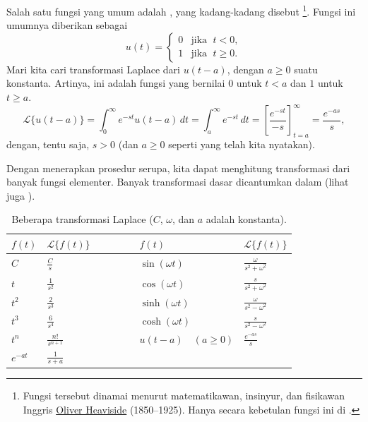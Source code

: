 \begin{example}
Salah satu fungsi yang umum adalah \emph{}, yang
kadang-kadang disebut \emph{}%
\footnote{Fungsi tersebut dinamai menurut matematikawan, insinyur, dan
fisikawan Inggris
\href{https://en.wikipedia.org/wiki/Heaviside}{Oliver Heaviside}
(1850--1925).  Hanya
secara kebetulan fungsi ini  di .}.
Fungsi ini umumnya diberikan sebagai
\begin{equation*}
u(t) = 
\begin{cases}
0 & \text{jika } \; t < 0 , \\
1 & \text{jika } \; t \geq 0 .
\end{cases}
\end{equation*}
Mari kita cari transformasi Laplace dari $u(t-a)$, dengan $a \geq 0$
suatu konstanta.
Artinya, ini adalah fungsi yang bernilai $0$ untuk $t < a$ dan $1$ untuk $t \geq a$.
\begin{equation*}
\mathcal{L} \bigl\{ u(t-a) \bigr\}
=
\int_0^{\infty} e^{-st} u(t-a) \, dt
=
\int_a^{\infty} e^{-st} \, dt
=
\left[ \frac{e^{-st}}{-s} \right]_{t=a}^\infty
=
\frac{e^{-as}}{s} ,
\end{equation*}
dengan, tentu saja, $s > 0$ (dan $a \geq 0$ seperti yang telah kita nyatakan).
\end{example}

Dengan menerapkan prosedur serupa, kita dapat menghitung transformasi dari banyak
fungsi elementer.  Banyak transformasi dasar dicantumkan dalam
 (lihat juga ).

\begin{table}[h!t]
\mybeginframe
\capstart
\begin{center}
\begin{tabular}{@{}lllll@{}}
\toprule
$f(t)$ & $\mathcal{L} \bigl\{ f(t) \bigr\}$ & $\qquad\quad$ &
$f(t)$ & $\mathcal{L} \bigl\{ f(t) \bigr\}$ \\
\midrule
$C$ & $\frac{C}{s}$
& &
$\sin (\omega t)$ & $\frac{\omega}{s^2+\omega^2}$
\\[4pt]
$t$ & $\frac{1}{s^2}$
& &
$\cos (\omega t)$ & $\frac{s}{s^2+\omega^2}$
\\[4pt]
$t^2$ & $\frac{2}{s^3}$
& &
$\sinh (\omega t)$ & $\frac{\omega}{s^2-\omega^2}$
\\[4pt]
$t^3$ & $\frac{6}{s^4}$
& &
$\cosh (\omega t)$ & $\frac{s}{s^2-\omega^2}$
\\[4pt]
$t^n$ & $\frac{n!}{s^{n+1}}$
& &
$u(t-a) \quad (a \geq 0)$ & $\frac{e^{-as}}{s}$
\\[4pt]
$e^{-at}$ & $\frac{1}{s+a}$
& & &
\\[4pt]
\bottomrule
\end{tabular}
\end{center}
\caption{Beberapa transformasi Laplace ($C$, $\omega$, dan $a$ adalah
konstanta).\label{lt:table}}
\myendframe
\end{table}

